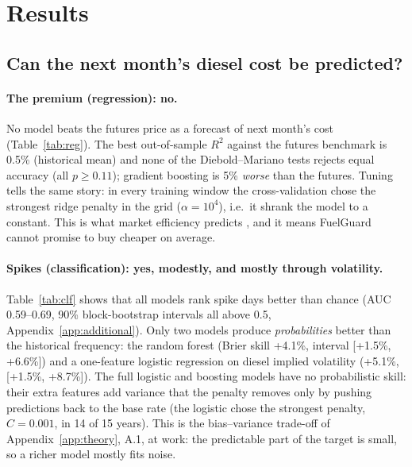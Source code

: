 \section{Results}\label{sec:results}

\subsection{Can the next month's diesel cost be predicted?}

\paragraph{The premium (regression): no.} No model beats the futures price as a forecast of next month's
cost (Table~\ref{tab:reg}). The best out-of-sample $R^2$ against the futures benchmark is 0.5\% (historical
mean) and none of the Diebold--Mariano tests rejects equal accuracy (all $p\ge0.11$); gradient boosting is
5\% \emph{worse} than the futures. Tuning tells the same story: in every training window the cross-validation
chose the strongest ridge penalty in the grid ($\alpha=10^4$), i.e.\ it shrank the model to a constant. This
is what market efficiency predicts \citep{fama1987,alquist2013}, and it means FuelGuard cannot promise
to buy cheaper on average.

\begin{table}[H]
\centering\small
{}
\caption{Regression of the premium, out of sample 2012--2026 (3\,725 days). $R^2_{OS}$ and the DM test
are relative to the futures price (zero premium); DM uses Newey--West errors with 21 lags.}
\label{tab:reg}
\end{table}

\paragraph{Spikes (classification): yes, modestly, and mostly through volatility.} Table~\ref{tab:clf}
shows that all models rank spike days better than chance (AUC 0.59--0.69, 90\% block-bootstrap intervals
all above 0.5, Appendix~\ref{app:additional}). Only two models produce \emph{probabilities} better than the
historical frequency: the random forest (Brier skill +4.1\%, interval [+1.5\%, +6.6\%]) and a one-feature
logistic regression on diesel implied volatility (+5.1\%, [+1.5\%, +8.7\%]). The full logistic and boosting
models have no probabilistic skill: their extra features add variance that the penalty removes only by
pushing predictions back to the base rate (the logistic chose the strongest penalty, $C=0.001$, in 14 of 15
years). This is the bias--variance trade-off of Appendix~\ref{app:theory}, A.1, at work: the predictable part
of the target is small, so a richer model mostly fits noise.

